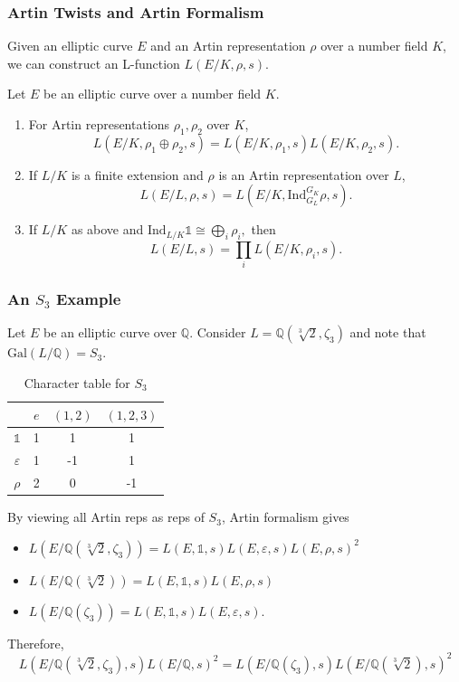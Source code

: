 \documentclass{beamer}
\newcommand{\Gal}{\mathrm{Gal}}
\newcommand{\Ind}{\mathrm{Ind}}
\newcommand{\QQ}{\mathbb{Q}}
\theoremstyle{plain}
\begin{document}
\begin{frame}
    \frametitle{Artin Twists and Artin Formalism}
    Given an elliptic curve $E$ and an Artin representation $\rho$ over a number field $K$, we can construct an L-function $L(E/K,\rho,s)$. \pause

    \begin{theorem}
        Let $E$ be an elliptic curve over a number field $K$. 
        \begin{enumerate}
            \item For Artin representations $\rho_1,\rho_2$ over $K$,
            $$L(E/K,\rho_1\oplus\rho_2,s)=L(E/K,\rho_1,s)L(E/K,\rho_2,s).$$ 
            \item If $L/K$ is a finite extension and $\rho$ is an Artin representation over $L$,
            $$L(E/L,\rho,s)=L(E/K,\Ind_{G_L}^{G_K}\rho,s).$$
            \item If $L/K$ as above and 
            $\Ind_{L/K}\mathds{1}\cong\bigoplus_i\rho_i,$
            then 
            $$L(E/L,s)=\prod_i L(E/K,\rho_i,s).$$
        \end{enumerate}        
    \end{theorem}
\end{frame}

\begin{frame}
    \frametitle{An $S_3$ Example}
    Let $E$ be an elliptic curve over $\QQ$. Consider $L=\QQ(\sqrt[3]{2},\zeta_3)$ and note that $\Gal(L/\QQ)=S_3$. 
    \begin{table}[]
        \begin{tabular}{|c|c c c|}
            \hline
                        & $e$ & $(1,2)$ & $(1,2,3)$ \\ \hline
            $\mathds{1}$  & 1   & 1       & 1         \\ 
            $\varepsilon$ & 1   & -1      & 1         \\ 
            $\rho$        & 2   & 0       & -1        \\ \hline
        \end{tabular}
        \caption[short]{Character table for $S_3$}
    \end{table} \pause
    By viewing all Artin reps as reps of $S_3$, Artin formalism gives
    \begin{itemize}
        \item $L(E/\QQ(\sqrt[3]{2},\zeta_3))=L(E,\mathds{1},s)L(E,\varepsilon,s)L(E,\rho,s)^2$ \pause
        \item $L(E/\QQ(\sqrt[3]{2}))=L(E,\mathds{1},s)L(E,\rho,s)$ \pause
        \item $L(E/\QQ(\zeta_3))=L(E,\mathds{1},s)L(E,\varepsilon,s)$. \pause
    \end{itemize}
    Therefore,
    $$L(E/\QQ(\sqrt[3]{2},\zeta_3),s)L(E/\QQ,s)^2=L(E/\QQ(\zeta_3),s)L(E/\QQ(\sqrt[3]{2}),s)^2$$    
\end{frame}
\end{document}
